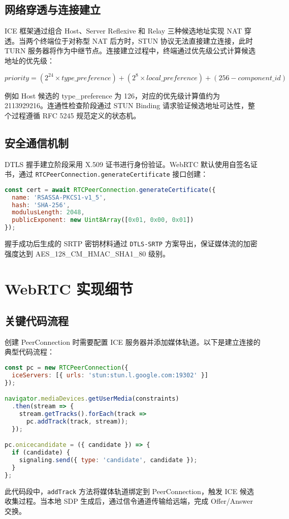 \section{网络穿透与连接建立}
ICE 框架通过组合 Host、Server Reflexive 和 Relay 三种候选地址实现 NAT 穿透。当两个终端位于对称型 NAT 后方时，STUN 协议无法直接建立连接，此时 TURN 服务器将作为中继节点。连接建立过程中，终端通过优先级公式计算候选地址的优先级：\par
$$ priority = (2^{24} \times type\_preference) + (2^{8} \times local\_preference) + (256 - component\_id) $$\par
例如 Host 候选的 type\_{}preference 为 126，对应的优先级计算值约为 2113929216。连通性检查阶段通过 STUN Binding 请求验证候选地址可达性，整个过程遵循 RFC 5245 规范定义的状态机。\par
\section{安全通信机制}
DTLS 握手建立阶段采用 X.509 证书进行身份验证。WebRTC 默认使用自签名证书，通过 \verb!RTCPeerConnection.generateCertificate! 接口创建：\par
\begin{lstlisting}[language=javascript]
const cert = await RTCPeerConnection.generateCertificate({
  name: 'RSASSA-PKCS1-v1_5',
  hash: 'SHA-256',
  modulusLength: 2048,
  publicExponent: new Uint8Array([0x01, 0x00, 0x01])
});
\end{lstlisting}
握手成功后生成的 SRTP 密钥材料通过 \verb!DTLS-SRTP! 方案导出，保证媒体流的加密强度达到 AES\_{}128\_{}CM\_{}HMAC\_{}SHA1\_{}80 级别。\par
\chapter{WebRTC 实现细节}
\section{关键代码流程}
创建 PeerConnection 时需要配置 ICE 服务器并添加媒体轨道。以下是建立连接的典型代码流程：\par
\begin{lstlisting}[language=javascript]
const pc = new RTCPeerConnection({
  iceServers: [{ urls: 'stun:stun.l.google.com:19302' }]
});

navigator.mediaDevices.getUserMedia(constraints)
  .then(stream => {
    stream.getTracks().forEach(track => 
      pc.addTrack(track, stream));
  });

pc.onicecandidate = ({ candidate }) => {
  if (candidate) {
    signaling.send({ type: 'candidate', candidate });
  }
};
\end{lstlisting}
此代码段中，\verb!addTrack! 方法将媒体轨道绑定到 PeerConnection，触发 ICE 候选收集过程。当本地 SDP 生成后，通过信令通道传输给远端，完成 Offer/Answer 交换。\par
